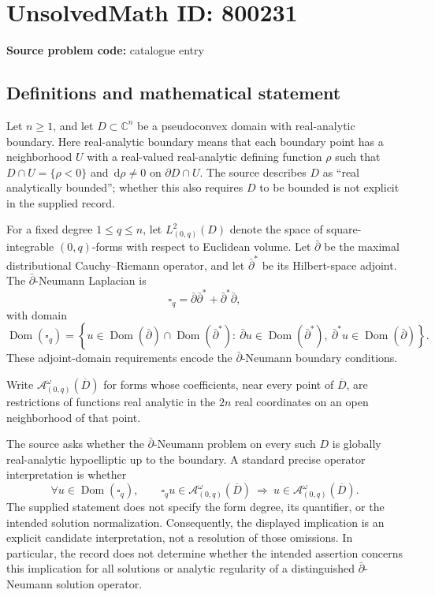 \documentclass[11pt]{article}
\newcommand{\C}{\mathbb{C}}
\newcommand{\dd}{\,\mathrm{d}}
\begin{document}
\section*{UnsolvedMath ID: 800231}
\textbf{Source problem code:} catalogue entry
\subsection{Definitions and mathematical statement}
Let \(n\geq 1\), and let \(D\subset\C^n\) be a pseudoconvex domain with real-analytic boundary. Here real-analytic boundary means that each boundary point has a neighborhood \(U\) with a real-valued real-analytic defining function \(\rho\) such that \(D\cap U=\{\rho<0\}\) and \(\dd\rho\neq 0\) on \(\partial D\cap U\). The source describes \(D\) as ``real analytically bounded''; whether this also requires \(D\) to be bounded is not explicit in the supplied record.

For a fixed degree \(1\leq q\leq n\), let \(L^2_{(0,q)}(D)\) denote the space of square-integrable \((0,q)\)-forms with respect to Euclidean volume. Let \(\bar\partial\) be the maximal distributional Cauchy--Riemann operator, and let \(\bar\partial^{\ast}\) be its Hilbert-space adjoint. The \(\bar\partial\)-Neumann Laplacian is
\[
\square_q=\bar\partial\bar\partial^{\ast}+\bar\partial^{\ast}\bar\partial,
\]
with domain
\[
\operatorname{Dom}(\square_q)=\left\{u\in\operatorname{Dom}(\bar\partial)\cap\operatorname{Dom}(\bar\partial^{\ast}):\ \bar\partial u\in\operatorname{Dom}(\bar\partial^{\ast}),\ \bar\partial^{\ast}u\in\operatorname{Dom}(\bar\partial)\right\}.
\]
These adjoint-domain requirements encode the \(\bar\partial\)-Neumann boundary conditions.

Write \(\mathcal A^\omega_{(0,q)}(\overline D)\) for forms whose coefficients, near every point of \(\overline D\), are restrictions of functions real analytic in the \(2n\) real coordinates on an open neighborhood of that point.

The source asks whether the \(\bar\partial\)-Neumann problem on every such \(D\) is globally real-analytic hypoelliptic up to the boundary. A standard precise operator interpretation is whether
\[
\forall u\in\operatorname{Dom}(\square_q),\qquad
\square_q u\in\mathcal A^\omega_{(0,q)}(\overline D)
\ \Longrightarrow\ 
u\in\mathcal A^\omega_{(0,q)}(\overline D).
\]
The supplied statement does not specify the form degree, its quantifier, or the intended solution normalization. Consequently, the displayed implication is an explicit candidate interpretation, not a resolution of those omissions. In particular, the record does not determine whether the intended assertion concerns this implication for all solutions or analytic regularity of a distinguished \(\bar\partial\)-Neumann solution operator.
\end{document}
